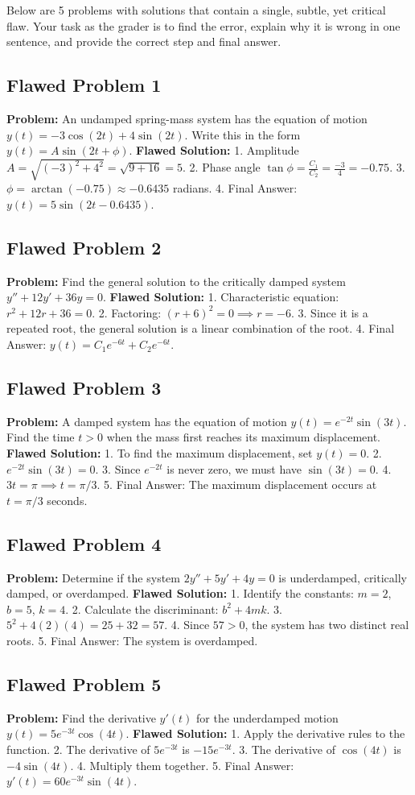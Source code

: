 \documentclass[11pt]{article}
\begin{document}
Below are 5 problems with solutions that contain a single, subtle, yet critical flaw. Your task as the grader is to find the error, explain why it is wrong in one sentence, and provide the correct step and final answer.

\subsection{Flawed Problem 1}
\textbf{Problem:} An undamped spring-mass system has the equation of motion $y(t) = -3 \cos(2t) + 4 \sin(2t)$. Write this in the form $y(t) = A \sin(2t + \phi)$.
\textbf{Flawed Solution:}
1. Amplitude $A = \sqrt{(-3)^2 + 4^2} = \sqrt{9 + 16} = 5$.
2. Phase angle $\tan \phi = \frac{C_1}{C_2} = \frac{-3}{4} = -0.75$.
3. $\phi = \arctan(-0.75) \approx -0.6435$ radians.
4. Final Answer: $y(t) = 5 \sin(2t - 0.6435)$.

\subsection{Flawed Problem 2}
\textbf{Problem:} Find the general solution to the critically damped system $y'' + 12y' + 36y = 0$.
\textbf{Flawed Solution:}
1. Characteristic equation: $r^2 + 12r + 36 = 0$.
2. Factoring: $(r + 6)^2 = 0 \implies r = -6$.
3. Since it is a repeated root, the general solution is a linear combination of the root.
4. Final Answer: $y(t) = C_1 e^{-6t} + C_2 e^{-6t}$.

\subsection{Flawed Problem 3}
\textbf{Problem:} A damped system has the equation of motion $y(t) = e^{-2t} \sin(3t)$. Find the time $t > 0$ when the mass first reaches its maximum displacement.
\textbf{Flawed Solution:}
1. To find the maximum displacement, set $y(t) = 0$.
2. $e^{-2t} \sin(3t) = 0$.
3. Since $e^{-2t}$ is never zero, we must have $\sin(3t) = 0$.
4. $3t = \pi \implies t = \pi/3$.
5. Final Answer: The maximum displacement occurs at $t = \pi/3$ seconds.

\subsection{Flawed Problem 4}
\textbf{Problem:} Determine if the system $2y'' + 5y' + 4y = 0$ is underdamped, critically damped, or overdamped.
\textbf{Flawed Solution:}
1. Identify the constants: $m = 2$, $b = 5$, $k = 4$.
2. Calculate the discriminant: $b^2 + 4mk$.
3. $5^2 + 4(2)(4) = 25 + 32 = 57$.
4. Since $57 > 0$, the system has two distinct real roots.
5. Final Answer: The system is overdamped.

\subsection{Flawed Problem 5}
\textbf{Problem:} Find the derivative $y'(t)$ for the underdamped motion $y(t) = 5e^{-3t} \cos(4t)$.
\textbf{Flawed Solution:}
1. Apply the derivative rules to the function.
2. The derivative of $5e^{-3t}$ is $-15e^{-3t}$.
3. The derivative of $\cos(4t)$ is $-4\sin(4t)$.
4. Multiply them together.
5. Final Answer: $y'(t) = 60e^{-3t} \sin(4t)$.
\end{document}
